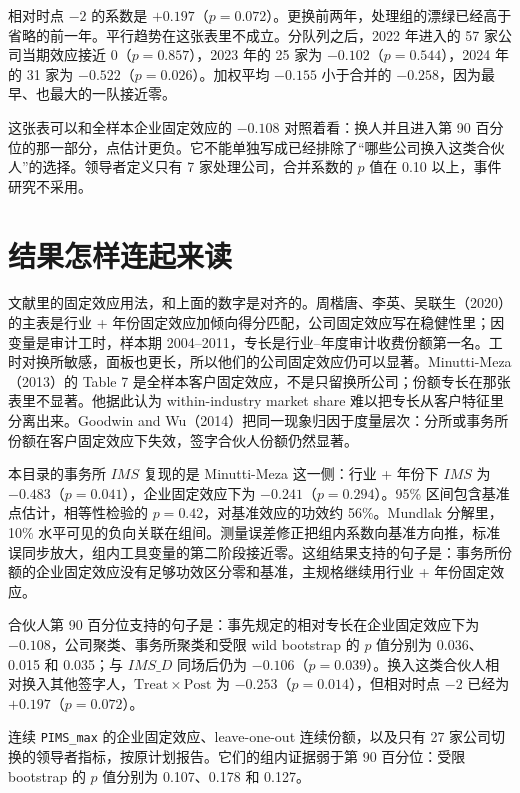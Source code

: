 \documentclass[11pt]{article}
\begin{document}
相对时点 \(-2\) 的系数是 \(+0.197\)（\(p=0.072\)）。更换前两年，处理组的漂绿已经高于省略的前一年。平行趋势在这张表里不成立。分队列之后，2022 年进入的 57 家公司当期效应接近 0（\(p=0.857\)），2023 年的 25 家为 \(-0.102\)（\(p=0.544\)），2024 年的 31 家为 \(-0.522\)（\(p=0.026\)）。加权平均 \(-0.155\) 小于合并的 \(-0.258\)，因为最早、也最大的一队接近零。

这张表可以和全样本企业固定效应的 \(-0.108\) 对照着看：换人并且进入第 90 百分位的那一部分，点估计更负。它不能单独写成已经排除了``哪些公司换入这类合伙人''的选择。领导者定义只有 7 家处理公司，合并系数的 \(p\) 值在 0.10 以上，事件研究不采用。

\section{结果怎样连起来读}
\label{sec:read}

文献里的固定效应用法，和上面的数字是对齐的。周楷唐、李英、吴联生（2020）的主表是行业 + 年份固定效应加倾向得分匹配，公司固定效应写在稳健性里；因变量是审计工时，样本期 2004--2011，专长是行业--年度审计收费份额第一名。工时对换所敏感，面板也更长，所以他们的公司固定效应仍可以显著。Minutti-Meza（2013）的 Table 7 是全样本客户固定效应，不是只留换所公司；份额专长在那张表里不显著。他据此认为 within-industry market share 难以把专长从客户特征里分离出来。Goodwin and Wu（2014）把同一现象归因于度量层次：分所或事务所份额在客户固定效应下失效，签字合伙人份额仍然显著。

本目录的事务所 \(IMS\) 复现的是 Minutti-Meza 这一侧：行业 + 年份下 \(IMS\) 为 \(-0.483\)（\(p=0.041\)），企业固定效应下为 \(-0.241\)（\(p=0.294\)）。95\% 区间包含基准点估计，相等性检验的 \(p=0.42\)，对基准效应的功效约 56\%。Mundlak 分解里，10\% 水平可见的负向关联在组间。测量误差修正把组内系数向基准方向推，标准误同步放大，组内工具变量的第二阶段接近零。这组结果支持的句子是：事务所份额的企业固定效应没有足够功效区分零和基准，主规格继续用行业 + 年份固定效应。

合伙人第 90 百分位支持的句子是：事先规定的相对专长在企业固定效应下为 \(-0.108\)，公司聚类、事务所聚类和受限 wild bootstrap 的 \(p\) 值分别为 0.036、0.015 和 0.035；与 \(IMS\_D\) 同场后仍为 \(-0.106\)（\(p=0.039\)）。换入这类合伙人相对换入其他签字人，\(\mathrm{Treat}\times\mathrm{Post}\) 为 \(-0.253\)（\(p=0.014\)），但相对时点 \(-2\) 已经为 \(+0.197\)（\(p=0.072\)）。

连续 \texttt{PIMS\_max} 的企业固定效应、leave-one-out 连续份额，以及只有 27 家公司切换的领导者指标，按原计划报告。它们的组内证据弱于第 90 百分位：受限 bootstrap 的 \(p\) 值分别为 0.107、0.178 和 0.127。
\end{document}
